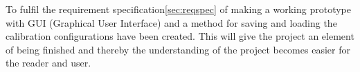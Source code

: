 To fulfil the requirement specification\ref{sec:reqspec} of making a working prototype with GUI (Graphical User Interface) and a method for saving and loading the calibration configurations have been created. This will give the project an element of being finished and thereby the understanding of the project becomes easier for the reader and user.